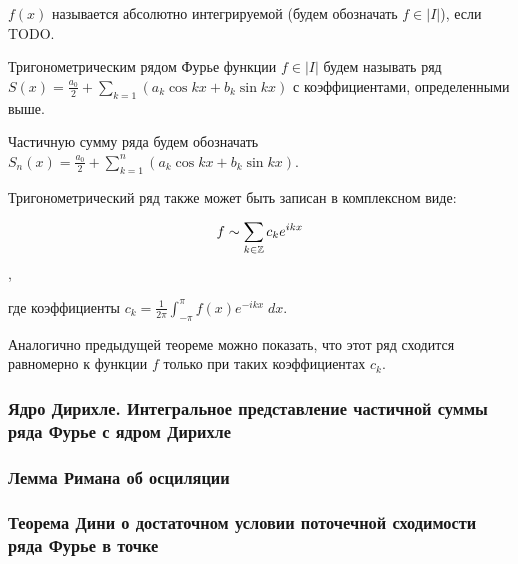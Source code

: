 \Endproof

\Def $f(x)$ называется абсолютно интегрируемой (будем обозначать $f \in |I|$), если TODO.

\Def Тригонометрическим рядом Фурье функции $f \in |I|$ будем называть ряд $S(x) = \frac{a_0}{2} + \sum_{k=1} \left(a_k \cos kx + b_k \sin kx\right)$ с коэффициентами, определенными выше.

Частичную сумму ряда будем обозначать $S_n(x) = \frac{a_0}{2} + \sum_{k=1}^n \left(a_k \cos kx + b_k \sin kx\right)$.

\Note Тригонометрический ряд также может быть записан в комплексном виде:

\begin{equation*}
    f \sim \sum_{k \in \mathbb{Z}} c_k e^{ikx}
\end{equation*}, 

где коэффициенты $c_k = \frac{1}{2\pi} \int_{-\pi}^{\pi} f(x) e^{-ikx} \; dx$.

Аналогично предыдущей теореме можно показать, что этот ряд сходится равномерно к функции $f$ только при таких коэффициентах $c_k$.

\subsubsection{Ядро Дирихле. Интегральное представление частичной суммы ряда Фурье с ядром Дирихле}

\subsubsection{Лемма Римана об осциляции}

\subsubsection{Теорема Дини о достаточном условии поточечной сходимости ряда Фурье в точке}